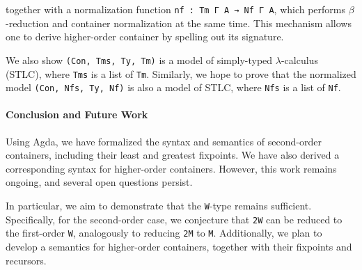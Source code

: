 \documentclass{easychair}
\begin{document}
\noindent
together with a normalization function \texttt{nf : Tm Γ A → Nf Γ A}, 
which performs $\beta$-reduction and container normalization at the same time.
This mechanism allows one to derive higher-order container by spelling out its signature.

We also show \texttt{(Con, Tms, Ty, Tm)} is a model of simply-typed
$\lambda$-calculus (STLC), where \texttt{Tms} is a list of \texttt{Tm}. Similarly, we hope
to prove that the normalized model \texttt{(Con, Nfs, Ty, Nf)} is also a model of STLC, where
\texttt{Nfs} is a list of \texttt{Nf}.

\paragraph{Conclusion and Future Work}
Using Agda, we have formalized the syntax and semantics of second-order containers, including their least and greatest fixpoints. We have also derived a corresponding syntax for higher-order containers. However, this work remains ongoing, and several open questions persist.

In particular, we aim to demonstrate that the \texttt{W}-type remains sufficient. Specifically, for the second-order case, we conjecture that \texttt{2W} can be reduced to the first-order \texttt{W}, analogously to reducing \texttt{2M} to \texttt{M}. Additionally, we plan to develop a semantics for higher-order containers, together with their fixpoints and recursors.




\end{document}
